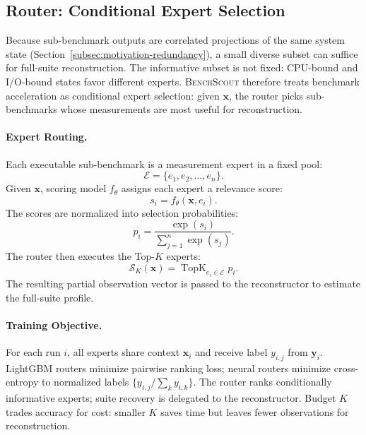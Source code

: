 \documentclass[sigplan,10pt]{acmart}
\newcommand{\ourmethod}{\textsc{BenchScout}\xspace}
\begin{document}
\subsection{Router: Conditional Expert Selection}
\label{subsec:router}

Because sub-benchmark outputs are correlated projections of the same system state (Section~\ref{subsec:motivation-redundancy}), a small diverse subset can suffice for full-suite reconstruction.
The informative subset is not fixed: CPU-bound and I/O-bound states favor different experts.
\ourmethod therefore treats benchmark acceleration as conditional expert selection: given \(\mathbf{x}\), the router picks sub-benchmarks whose measurements are most useful for reconstruction.

\paragraph{Expert Routing.}
Each executable sub-benchmark is a measurement expert in a fixed pool:
\begin{equation}
\label{eq:expert-pool}
\mathcal{E}=\{e_1,e_2,\ldots,e_n\}.
\end{equation}
Given \(\mathbf{x}\), scoring model \(f_\theta\) assigns each expert a relevance score:
\begin{equation}
\label{eq:router-score}
s_i=f_\theta(\mathbf{x},e_i).
\end{equation}
The scores are normalized into selection probabilities:
\begin{equation}
\label{eq:router-prob}
p_i=\frac{\exp(s_i)}{\sum_{j=1}^{n}\exp(s_j)}.
\end{equation}
The router then executes the Top-\(K\) experts:
\begin{equation}
\label{eq:topk}
\mathcal{S}_K(\mathbf{x})=\operatorname{TopK}_{e_i\in\mathcal{E}} p_i.
\end{equation}
The resulting partial observation vector is passed to the reconstructor to estimate the full-suite profile.

\paragraph{Training Objective.}
For each run $i$, all experts share context $\mathbf{x}_i$ and receive label $y_{i,j}$ from $\mathbf{y}_i$.
LightGBM routers minimize pairwise ranking loss; neural routers minimize cross-entropy to normalized labels $\{y_{i,j}/\sum_k y_{i,k}\}$.
The router ranks conditionally informative experts; suite recovery is delegated to the reconstructor.
Budget $K$ trades accuracy for cost: smaller $K$ saves time but leaves fewer observations for reconstruction.
\end{document}

